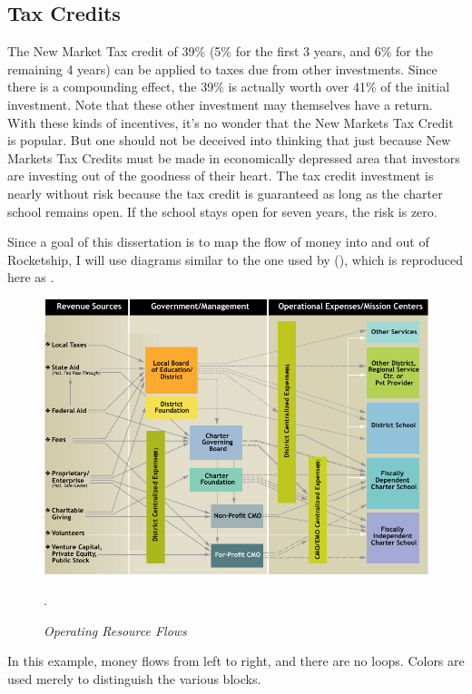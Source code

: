 \subsection{Tax Credits}
The New Market Tax credit of 39\% (5\% for the first 3 years, and 6\% for the remaining 4 years) can be applied to taxes due from other investments. Since there is a compounding effect, the 39\% is actually worth over 41\% of the initial investment. Note that these other investment may themselves have a return. With these kinds of incentives, it's no wonder that the New Markets Tax Credit is popular. But one should not be deceived into thinking that just because New Markets Tax Credits must be made in economically depressed area that investors are investing out of the goodness of their heart. The tax credit investment is nearly without risk because the tax credit is guaranteed as long as the charter school remains open. If the school stays open for seven years, the risk is zero.

Since a goal of this dissertation is to map the flow of money into and out of Rocketship, I will use diagrams similar to the one used by \citeauthor{Baker.Miron2015} (\citeyear{Baker.Miron2015}), which is reproduced here as .

\begin{figure}[ht]
  \centering
  \caption[Operating Resource Flows]{\textit{Operating Resource Flows}}\label{fig:opresflows}
  \includegraphics[width=\textwidth]{Operating_Resource_Flows}\\
  \footnotesize\raggedright\textcite[16]{Baker.Miron2015}.
\end{figure}
In this example, money flows from left to right, and there are no loops. Colors are used merely to distinguish the various blocks.


